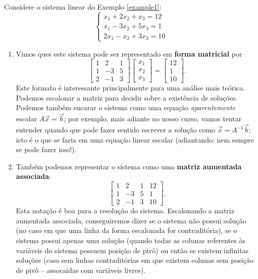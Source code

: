 \begin{ex}
Considere o sistema linear do Exemplo \ref{example1}:
\begin{equation}
\left\{
\begin{array}{ll}
x_1 + 2x_2 + x_3 = 12 \\
x_1 -3x_2 + 5x_3 = 1 \\
2x_1 - x_2 + 3x_3 = 10
\end{array}
\right.
\end{equation} 
\begin{enumerate}[$(i)$]
\item Vimos ques este sistema pode ser representado em \textbf{forma matricial} por
\begin{equation}
\left[
\begin{array}{ccc}
1 &  2 & 1  \\
1 & -3 & 5  \\
2 & -1 & 3
\end{array}
\right]
\left[
\begin{array}{c}
x_1   \\
x_2  \\
x_3
\end{array}
\right] =
\left[
\begin{array}{c}
12   \\
1  \\
10
\end{array}
\right].
\end{equation} Este formato é interessante principalmente para uma análise mais teórica. Podemos escalonar a matriz para decidir sobre a existência de soluções. Podemos também encarar o sistema como uma equação \textit{aparentemente} escalar $A \vec{x} = \vec{b}$; por exemplo, mais adiante no nosso curso, vamos tentar entender quando que pode fazer sentido escrever a solução como $\vec{x} = A^{-1} \vec{b}$; isto é o que se faria em uma equação linear escalar (adiantando: nem sempre se pode fazer isso!).
\item Também podemos representar o sistema como uma \textbf{matriz aumentada associada}:
\begin{equation}
\left[
\begin{array}{ccc|c}
1 &  2 & 1 & 12 \\
1 & -3 & 5 &  1 \\
2 & -1 & 3 & 10
\end{array}
\right].
\end{equation} Esta notação é boa para a resolução do sistema. Escalonando a matriz aumentada associada, conseguiremos dizer se o sistema não possui solução (no caso em que uma linha da forma escalonada for contraditória), se o sistema possui apenas uma solução (quando todas as colunas referentes às variáveis do sistema possuem posição de pivô) ou então se existem infinitas soluções (caso sem linhas contraditórias em que existem colunas sem posição de pivô -- assocaidas com variáveis livres).

\end{enumerate}
\end{ex}
